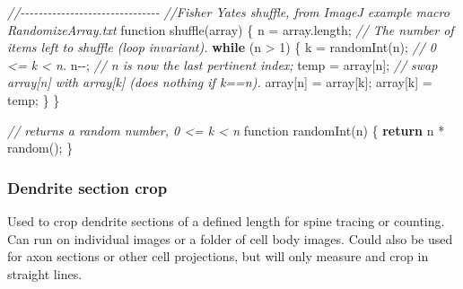\documentclass[
  12pt,
  a4paper,
]{book}
\newenvironment{Shaded}{}{}
\newcommand{\CommentTok}[1]{\textcolor[rgb]{0.38,0.63,0.69}{\textit{#1}}}
\newcommand{\ControlFlowTok}[1]{\textcolor[rgb]{0.00,0.44,0.13}{\textbf{#1}}}
\newcommand{\DecValTok}[1]{\textcolor[rgb]{0.25,0.63,0.44}{#1}}
\newcommand{\NormalTok}[1]{#1}
\newcommand{\OperatorTok}[1]{\textcolor[rgb]{0.40,0.40,0.40}{#1}}
\begin{document}
\begin{Shaded}
\begin{Highlighting}[]
\CommentTok{//{-}{-}{-}{-}{-}{-}{-}{-}{-}{-}{-}{-}{-}{-}{-}{-}{-}{-}{-}{-}{-}{-}{-}{-}{-}{-}{-}{-}{-}{-}{-}}
\CommentTok{//Fisher Yates shuffle, from ImageJ example macro RandomizeArray.txt}
\NormalTok{function shuffle}\OperatorTok{(}\NormalTok{array}\OperatorTok{)} \OperatorTok{\{}
\NormalTok{   n }\OperatorTok{=}\NormalTok{ array}\OperatorTok{.}\NormalTok{length}\OperatorTok{;}  \CommentTok{// The number of items left to shuffle (loop invariant).}
   \ControlFlowTok{while} \OperatorTok{(}\NormalTok{n }\OperatorTok{\textgreater{}} \DecValTok{1}\OperatorTok{)} \OperatorTok{\{}
\NormalTok{      k }\OperatorTok{=}\NormalTok{ randomInt}\OperatorTok{(}\NormalTok{n}\OperatorTok{);}     \CommentTok{// 0 \textless{}= k \textless{} n.}
\NormalTok{      n}\OperatorTok{{-}{-};}                  \CommentTok{// n is now the last pertinent index;}
\NormalTok{      temp }\OperatorTok{=}\NormalTok{ array}\OperatorTok{[}\NormalTok{n}\OperatorTok{];}  \CommentTok{// swap array[n] with array[k] (does nothing if k==n).}
\NormalTok{      array}\OperatorTok{[}\NormalTok{n}\OperatorTok{]} \OperatorTok{=}\NormalTok{ array}\OperatorTok{[}\NormalTok{k}\OperatorTok{];}
\NormalTok{      array}\OperatorTok{[}\NormalTok{k}\OperatorTok{]} \OperatorTok{=}\NormalTok{ temp}\OperatorTok{;}
   \OperatorTok{\}}
\OperatorTok{\}}

\CommentTok{// returns a random number, 0 \textless{}= k \textless{} n}
\NormalTok{function randomInt}\OperatorTok{(}\NormalTok{n}\OperatorTok{)} \OperatorTok{\{}
   \ControlFlowTok{return}\NormalTok{ n }\OperatorTok{*}\NormalTok{ random}\OperatorTok{();}
\OperatorTok{\}}
\end{Highlighting}
\end{Shaded}

\hypertarget{dend-crop}{%
\subsubsection{Dendrite section crop}\label{dend-crop}}

Used to crop dendrite sections of a defined length for spine tracing or counting. Can run on individual images or a folder of cell body images. Could also be used for axon sections or other cell projections, but will only measure and crop in straight lines.
\end{document}
